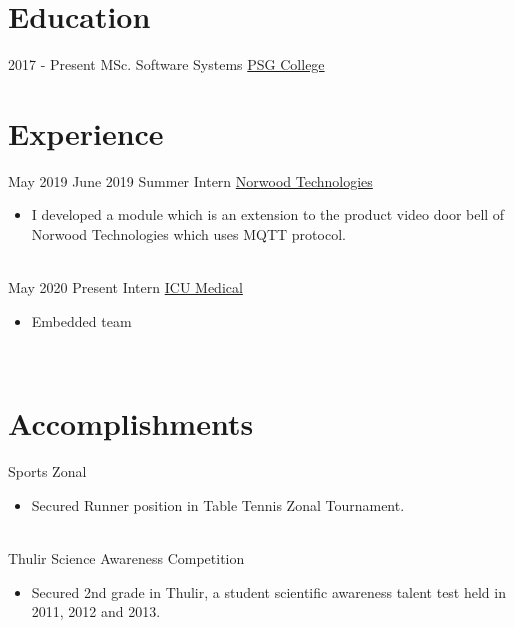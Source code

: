 \documentclass[letterpaper]{Baseclass}
\begin{document}
\makeprofile 

\section{Education}

\begin{envvar}
	\envvaritem
    	{2017 - Present}
        {}
        {\hspace{0.2cm}MSc. Software Systems }
        {\href{http://www.psgtech.edu/}{\hspace{0.27cm}PSG College}}
        {}
        {} 
\end{envvar}


\section{Experience}

\begin{envvar}
	\envvaritem
		{May 2019}
		{June 2019}
		{\hspace{0.3cm}Summer Intern}
		{\href{https://www.linkedin.com/company/norwoodtechnologies/}{Norwood Technologies}}
		{}
		{\begin{itemize}
			\item I developed a module which is an extension to the product video door bell of Norwood Technologies which uses MQTT protocol.
		\end{itemize}}
		\\
	\envvaritem
    	{May 2020}
		{Present}
        {\hspace{0.3cm}Intern}
        {\href{https://www.icumed.com/}{ICU Medical}}
        {}
        {\begin{itemize}
        \item Embedded team
        \end{itemize}}
        \\           
\end{envvar}

\section{Accomplishments}

\begin{envvar} 
	\envvaritem
	{Sports}
	{}
	{\hspace{0.3cm}Zonal}
	{}
	{}
	{
		{\begin{itemize}
				\item Secured Runner position in Table Tennis Zonal Tournament.
		\end{itemize}}
	}
	\\
	\envvaritem
	{Thulir}
	{}
	{\hspace{0.3cm}Science Awareness Competition}
	{}
	{}
	{
		{\begin{itemize}
				\item Secured 2nd grade in Thulir, a student scientific awareness talent test held in 2011, 2012 and 2013.
		\end{itemize}}
	}
	\\

\end{envvar}
\end{document}
